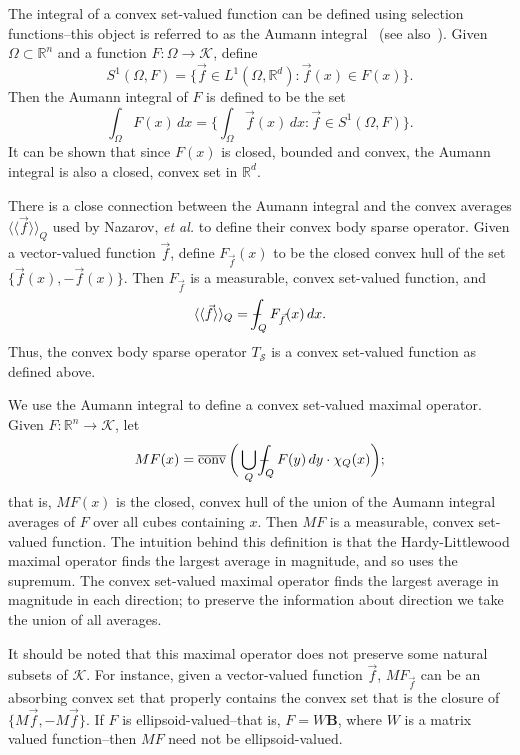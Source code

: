 \documentclass[12pt]{amsart}
\theoremstyle{definition}
\theoremstyle{remark}
\numberwithin{equation}{section}
\newcommand{\rn}{{{\mathbb R}^n}}
\newcommand{\rd}{{{\mathbb R}^d}}
\newcommand{\Ss}{\mathcal S}
\newcommand{\K}{\mathcal K}
\DeclareMathOperator{\clconv}{\overline{conv}}
\newcommand{\vecf}{\vec{f}}
\def\Xint#1{\mathchoice
   {\XXint\displaystyle\textstyle{#1}}%
   {\XXint\textstyle\scriptstyle{#1}}%
   {\XXint\scriptstyle\scriptscriptstyle{#1}}%
   {\XXint\scriptscriptstyle\scriptscriptstyle{#1}}%
   \!\int}
\def\XXint#1#2#3{{\setbox0=\hbox{$#1{#2#3}{\int}$}
     \vcenter{\hbox{$#2#3$}}\kern-.5\wd0}}
\def\avgint{\Xint-}
\begin{document}
The integral of a convex set-valued function can be defined using
selection functions--this object is referred to as the Aumann
integral~\cite{MR0185073} (see also~\cite{MR2458436}).  Given $\Omega
\subset \rn$ and a function $F : \Omega \rightarrow \K$, define
%
\[ S^1(\Omega, F) = \{ \vecf \in L^1(\Omega,\rd) : \vecf(x) \in
  F(x)\}.  \]
%
Then the Aumann integral of $F$ is defined to be the set
%
\[ \int_\Omega F(x)\,dx
  =
  \bigg\{ \int_\Omega \vecf(x)\,dx : \vecf \in S^1(\Omega,F)
  \bigg\}. \]
%
It can be shown that since $F(x)$ is closed, bounded and convex, the
Aumann integral is also a closed, convex set in $\rd$. 

There is a close connection between the Aumann integral and the convex
averages $\langle\langle \vecf \rangle\rangle_Q$ used by Nazarov, {\em
  et al.} to define their convex body sparse operator.  Given a
vector-valued function $\vecf$, define $F_{\vecf}(x)$ to be the closed
convex hull of the set $\{\vecf(x), -\vecf(x)\}$.  Then $F_{\vecf}$ is a
measurable, convex set-valued function, and
%
\[ \langle\langle \vecf \rangle\rangle_Q
  = \avgint_Q F_{\vecf}(x)\,dx. \]
%
Thus, the convex body sparse operator $T_\Ss$ is a convex set-valued
function as defined above.   

We use the Aumann integral to define a convex set-valued maximal
operator.  Given $F : \rn \rightarrow \K$, let
%
\[ MF(x) = \clconv\bigg(
  \bigcup_Q \avgint_Q F(y)\,dy \cdot \chi_Q (x) \bigg);  \]
%
that is, $MF(x)$ is the closed, convex hull of the union of the Aumann integral averages of
$F$ over all cubes containing $x$.   Then $MF$ is a measurable,
convex set-valued function.   The intuition
behind this definition is that the Hardy-Littlewood maximal operator
finds the largest average in magnitude, and so uses the supremum.  The
convex set-valued maximal operator finds the largest average in
magnitude in each direction; to preserve the information about
direction we take the union of all averages.

It should be noted that this maximal
operator does not preserve some natural subsets of $\K$.  For
instance, given a vector-valued function $\vecf$, $MF_{\vecf}$
can be an absorbing convex set that properly contains the convex set
that is the closure of $\{ M\vecf,-M\vecf\}$.  If $F$ is
ellipsoid-valued--that is, $F=W{\mathbf B}$, where $W$ is a matrix
valued function--then $MF$ need not be ellipsoid-valued.
\end{document}
